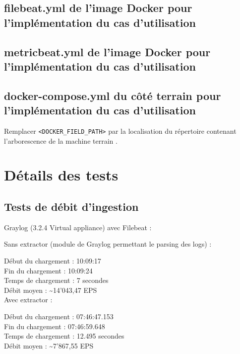 \documentclass[paper=a4, fontsize=11pt]{scrartcl}
\begin{document}
\subsection{filebeat.yml de l'image Docker pour l'implémentation du cas d'utilisation}
\label{appendix:filebeatConfDockerUC}


\subsection{metricbeat.yml de l'image Docker pour l'implémentation du cas d'utilisation}
\label{appendix:metricbeatConfDockerUC}


\subsection{docker-compose.yml du côté terrain pour l'implémentation du cas d'utilisation}
\label{appendix:dockercomposeFieldUC}

Remplacer \verb,<DOCKER_FIELD_PATH>, par la localisation du répertoire contenant l'arborescence de la machine \og terrain \fg.\\

\newpage



\section{Détails des tests}

\subsection{Tests de débit d'ingestion}

Graylog (3.2.4 Virtual appliance) avec Filebeat :

Sans extractor (module de Graylog permettant le parsing des logs) :

Début du chargement : 10:09:17 \\
Fin du chargement : 10:09:24 \\
Temps de chargement : 7 secondes \\
Débit moyen : \textasciitilde 14'043,47 EPS \\

Avec extractor :

Début du chargement : 07:46:47.153 \\
Fin du chargement : 07:46:59.648 \\
Temps de chargement : 12.495 secondes \\
Débit moyen : \textasciitilde 7'867,55 EPS \\
\end{document}
